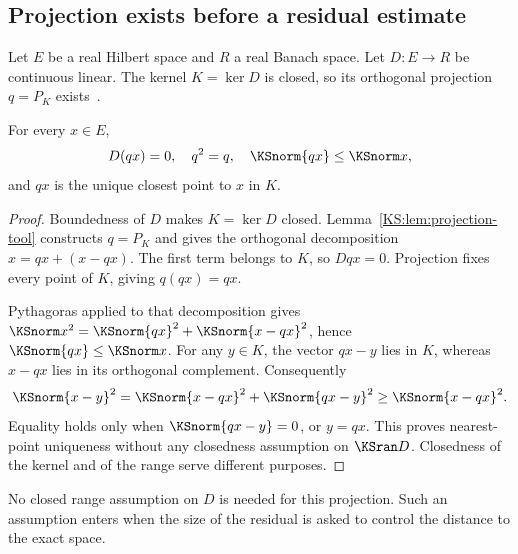 \label{KS:sec:closed}
\subsection{Projection exists before a residual estimate}
Let \(E\) be a real Hilbert space and \(R\) a real Banach space. Let \(D:E\to R\) be continuous linear. The kernel \(K=\ker D\) is closed, so its orthogonal projection \(q=P_K\) exists~\cite{KS:mathlib-projection}.

\begin{KSproposition}\label{KS:KS42}
For every \(x\in E\),
\[
 D(qx)=0,\quad q^2=q,\quad\KSnorm{qx}\le\KSnorm x,
\]
and \(qx\) is the unique closest point to \(x\) in \(K\).
\end{KSproposition}
\begin{proof}
Boundedness of \(D\) makes \(K=\ker D\) closed. Lemma~\ref{KS:lem:projection-tool} constructs \(q=P_K\) and gives the orthogonal decomposition \(x=qx+(x-qx)\). The first term belongs to \(K\), so \(Dqx=0\). Projection fixes every point of \(K\), giving \(q(qx)=qx\).

Pythagoras applied to that decomposition gives \(\KSnorm x^2=\KSnorm{qx}^2+\KSnorm{x-qx}^2\), hence \(\KSnorm{qx}\le\KSnorm x\). For any \(y\in K\), the vector \(qx-y\) lies in \(K\), whereas \(x-qx\) lies in its orthogonal complement. Consequently
\[
 \KSnorm{x-y}^2=\KSnorm{x-qx}^2+\KSnorm{qx-y}^2\ge\KSnorm{x-qx}^2.
\]
Equality holds only when \(\KSnorm{qx-y}=0\), or \(y=qx\). This proves nearest-point uniqueness without any closedness assumption on \(\KSran D\). Closedness of the kernel and of the range serve different purposes.
\end{proof}
No closed range assumption on \(D\) is needed for this projection. Such an assumption enters when the size of the residual is asked to control the distance to the exact space.

